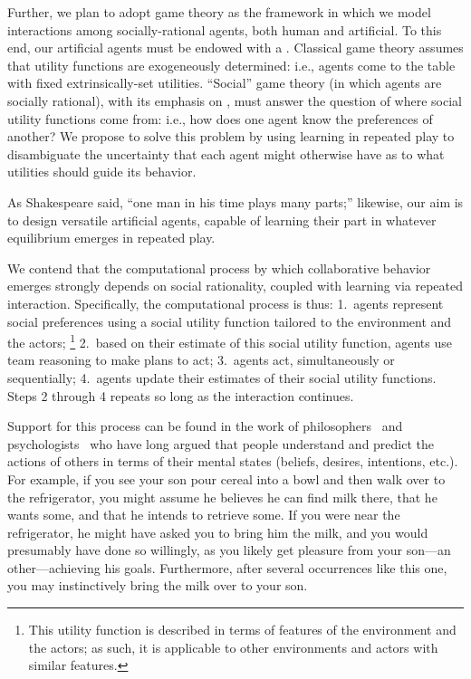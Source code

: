 
Further, we plan to adopt game theory as the framework in which we
model interactions among socially-rational agents, both human and
artificial.  To this end, our artificial agents must be endowed with a
.
%
Classical game theory assumes that utility functions are exogeneously
determined: i.e., agents come to the table with fixed
extrinsically-set utilities.  ``Social'' game theory (in which agents
are socially rational), with its emphasis on , must
answer the question of where social utility functions come from: i.e.,
how does one agent know the preferences of another?  We propose to
solve this problem by using learning in repeated play to disambiguate
the uncertainty that each agent might otherwise have as to what
utilities should guide its behavior.


As Shakespeare said, ``one man in his time plays many parts;''
likewise,
our aim is to design versatile artificial agents, capable of learning
their part in whatever equilibrium emerges in repeated play.


We contend that the computational process by which collaborative
behavior emerges strongly depends on social rationality, coupled with
learning via repeated interaction.
%
Specifically, the computational process is thus:
1.~agents represent social preferences using a social utility function
tailored to the environment and the actors;%
\footnote{This utility function is described in terms of features of the environment and the actors;
as such, it is applicable to other environments and actors with similar features.}
2.~based on their estimate of this social utility function, agents use team reasoning to make plans to act;
3.~agents act, simultaneously or sequentially;
4.~agents update their estimates of their social utility functions.
Steps 2 through 4 repeats so long as the interaction continues.

Support for this process can be found in the work of
philosophers~\cite{dennett87} and psychologists~\cite{heider44} who
have long argued that people understand and predict the actions of
others in terms of their  mental states (beliefs, desires, intentions,
etc.).  For example, if you see your son pour cereal into a bowl and
then walk over to the refrigerator, you might assume he believes he can find milk there,
that he wants some, and that he intends to retrieve some.  If you were near the refrigerator, he
might have asked you to bring him the milk, and you would presumably
have done so willingly, as you likely get pleasure from your son---an
other---achieving his goals.  Furthermore, after several occurrences
like this one, you may instinctively bring the milk over to your son.

